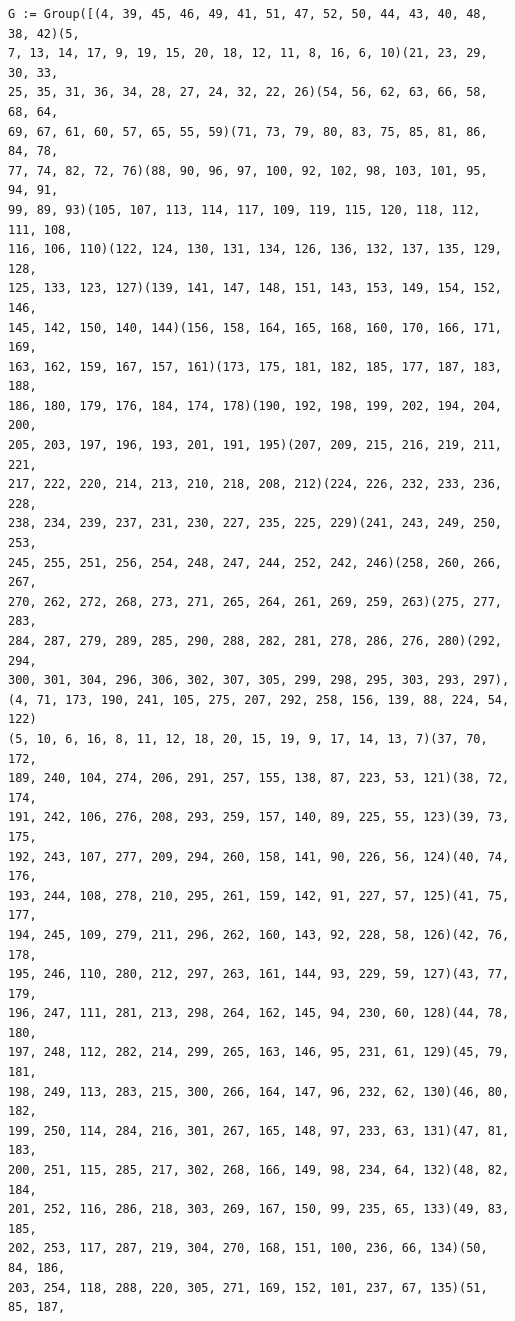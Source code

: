 \begin{verbatim}
G := Group([(4, 39, 45, 46, 49, 41, 51, 47, 52, 50, 44, 43, 40, 48, 38, 42)(5, 
7, 13, 14, 17, 9, 19, 15, 20, 18, 12, 11, 8, 16, 6, 10)(21, 23, 29, 30, 33, 
25, 35, 31, 36, 34, 28, 27, 24, 32, 22, 26)(54, 56, 62, 63, 66, 58, 68, 64, 
69, 67, 61, 60, 57, 65, 55, 59)(71, 73, 79, 80, 83, 75, 85, 81, 86, 84, 78, 
77, 74, 82, 72, 76)(88, 90, 96, 97, 100, 92, 102, 98, 103, 101, 95, 94, 91, 
99, 89, 93)(105, 107, 113, 114, 117, 109, 119, 115, 120, 118, 112, 111, 108, 
116, 106, 110)(122, 124, 130, 131, 134, 126, 136, 132, 137, 135, 129, 128, 
125, 133, 123, 127)(139, 141, 147, 148, 151, 143, 153, 149, 154, 152, 146, 
145, 142, 150, 140, 144)(156, 158, 164, 165, 168, 160, 170, 166, 171, 169, 
163, 162, 159, 167, 157, 161)(173, 175, 181, 182, 185, 177, 187, 183, 188, 
186, 180, 179, 176, 184, 174, 178)(190, 192, 198, 199, 202, 194, 204, 200, 
205, 203, 197, 196, 193, 201, 191, 195)(207, 209, 215, 216, 219, 211, 221, 
217, 222, 220, 214, 213, 210, 218, 208, 212)(224, 226, 232, 233, 236, 228, 
238, 234, 239, 237, 231, 230, 227, 235, 225, 229)(241, 243, 249, 250, 253, 
245, 255, 251, 256, 254, 248, 247, 244, 252, 242, 246)(258, 260, 266, 267, 
270, 262, 272, 268, 273, 271, 265, 264, 261, 269, 259, 263)(275, 277, 283, 
284, 287, 279, 289, 285, 290, 288, 282, 281, 278, 286, 276, 280)(292, 294, 
300, 301, 304, 296, 306, 302, 307, 305, 299, 298, 295, 303, 293, 297), 
(4, 71, 173, 190, 241, 105, 275, 207, 292, 258, 156, 139, 88, 224, 54, 122)
(5, 10, 6, 16, 8, 11, 12, 18, 20, 15, 19, 9, 17, 14, 13, 7)(37, 70, 172, 
189, 240, 104, 274, 206, 291, 257, 155, 138, 87, 223, 53, 121)(38, 72, 174, 
191, 242, 106, 276, 208, 293, 259, 157, 140, 89, 225, 55, 123)(39, 73, 175, 
192, 243, 107, 277, 209, 294, 260, 158, 141, 90, 226, 56, 124)(40, 74, 176, 
193, 244, 108, 278, 210, 295, 261, 159, 142, 91, 227, 57, 125)(41, 75, 177, 
194, 245, 109, 279, 211, 296, 262, 160, 143, 92, 228, 58, 126)(42, 76, 178, 
195, 246, 110, 280, 212, 297, 263, 161, 144, 93, 229, 59, 127)(43, 77, 179, 
196, 247, 111, 281, 213, 298, 264, 162, 145, 94, 230, 60, 128)(44, 78, 180, 
197, 248, 112, 282, 214, 299, 265, 163, 146, 95, 231, 61, 129)(45, 79, 181, 
198, 249, 113, 283, 215, 300, 266, 164, 147, 96, 232, 62, 130)(46, 80, 182, 
199, 250, 114, 284, 216, 301, 267, 165, 148, 97, 233, 63, 131)(47, 81, 183, 
200, 251, 115, 285, 217, 302, 268, 166, 149, 98, 234, 64, 132)(48, 82, 184, 
201, 252, 116, 286, 218, 303, 269, 167, 150, 99, 235, 65, 133)(49, 83, 185, 
202, 253, 117, 287, 219, 304, 270, 168, 151, 100, 236, 66, 134)(50, 84, 186, 
203, 254, 118, 288, 220, 305, 271, 169, 152, 101, 237, 67, 135)(51, 85, 187, 

\end{verbatim}

